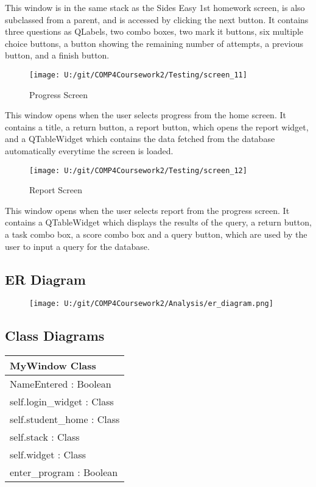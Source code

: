 This window is in the same stack as the Sides Easy 1st homework screen, is also subclassed from a parent, and is accessed by clicking the next button. It contains three questions as QLabels, two combo boxes, two mark it buttons, six multiple choice buttons, a button showing the remaining number of attempts, a previous button, and a finish button.

\begin{figure}[H]
    \label{fig: Second Screen}\caption{Progress Screen}
    \texttt{[image: U:/git/COMP4Coursework2/Testing/screen\_11]}
\end{figure}

This window opens when the user selects progress from the home screen. It contains a title, a return button, a report button, which opens the report widget, and a QTableWidget which contains the data fetched from the database automatically everytime the screen is loaded.

\begin{figure}[H]
    \label{fig: Second Screen}\caption{Report Screen}
    \texttt{[image: U:/git/COMP4Coursework2/Testing/screen\_12]}
\end{figure}

This window opens when the user selects report from the progress screen. It contains a QTableWidget which displays the results of the query, a return button, a task combo box, a score combo box and a query button, which are used by the user to input a query for the database.

\subsection{ER Diagram}

\begin{figure}[H]
    \texttt{[image: U:/git/COMP4Coursework2/Analysis/er\_diagram.png]}
    \label{fig:print_function_result}
\end{figure}

\subsection{Class Diagrams}

\begin{center}
\begin{tabular}{|p{7cm}|} \hline
\textbf{MyWindow Class} \\ \hline
NameEntered : Boolean \\
self.login\_widget : Class \\
self.student\_home : Class \\
self.stack : Class \\
self.widget : Class \\ \hline
enter\_program : Boolean \\ \hline
\end{tabular}
\end{center}

